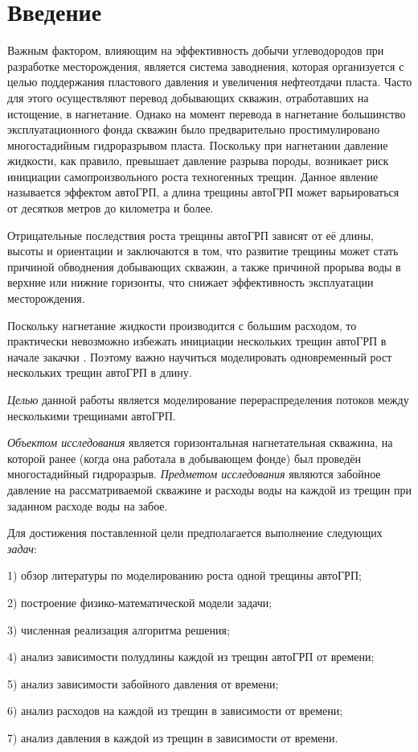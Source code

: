 \chapter*{Введение} %


Важным фактором, влияющим на эффективность добычи углеводородов при разработке месторождения, является система заводнения, которая организуется с целью поддержания пластового давления и увеличения нефтеотдачи пласта.
Часто для этого осуществляют перевод добывающих скважин, отработавших на истощение, в нагнетание.
Однако на момент перевода в нагнетание большинство эксплуатационного фонда скважин было предварительно простимулировано многостадийным гидроразрывом пласта.
Поскольку при нагнетании давление жидкости, как правило, превышает давление разрыва породы, возникает риск инициации самопроизвольного роста техногенных трещин.
Данное явление называется эффектом автоГРП, а длина трещины автоГРП может варьироваться от десятков метров до километра и более.

Отрицательные последствия роста трещины автоГРП зависят от её длины, высоты и ориентации и заключаются в том, что развитие трещины может стать причиной обводнения добывающих скважин, а также причиной прорыва воды в верхние или нижние горизонты, что снижает эффективность эксплуатации месторождения.

Поскольку нагнетание жидкости производится с большим расходом, то практически невозможно избежать инициации нескольких трещин автоГРП в начале закачки \cite{baikov}.
Поэтому важно научиться моделировать одновременный рост нескольких трещин автоГРП в длину.

\emph{Целью} данной работы является моделирование перераспределения потоков между несколькими трещинами автоГРП.

\emph{Объектом исследования} является горизонтальная нагнетательная скважина, на которой ранее (когда она работала в добывающем фонде) был проведён многостадийный гидроразрыв.
\emph{Предметом исследования} являются забойное давление на рассматриваемой скважине и расходы воды на каждой из трещин при заданном расходе воды на забое.

Для достижения поставленной цели предполагается выполнение следующих \emph{задач}:

1) обзор литературы по моделированию роста одной трещины автоГРП;

2) построение физико-математической модели задачи;

3) численная реализация алгоритма решения;

4) анализ зависимости полудлины каждой из трещин автоГРП от времени;

5) анализ зависимости забойного давления от времени;

6) анализ расходов на каждой из трещин в зависимости от времени;

7) анализ давления в каждой из трещин в зависимости от времени.